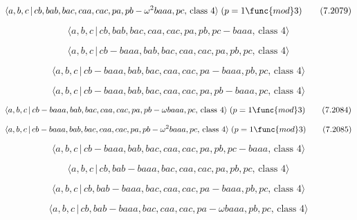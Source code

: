 \documentclass[10pt]{article}
\begin{document}
\begin{equation}
\langle a,b,c\,|\,cb,bab,bac,caa,cac,pa,pb-\omega ^{2}baaa,pc,\,\text{class }%
4\rangle \;(p=1\func{mod}3)  \tag{7.2079}
\end{equation}

\begin{equation}
\langle a,b,c\,|\,cb,bab,bac,caa,cac,pa,pb,pc-baaa,\,\text{class }4\rangle 
\tag{7.2080}
\end{equation}

\begin{equation}
\langle a,b,c\,|\,cb-baaa,bab,bac,caa,cac,pa,pb,pc,\,\text{class }4\rangle 
\tag{7.2081}
\end{equation}

\begin{equation}
\langle a,b,c\,|\,cb-baaa,bab,bac,caa,cac,pa-baaa,pb,pc,\,\text{class }%
4\rangle  \tag{7.2082}
\end{equation}

\begin{equation}
\langle a,b,c\,|\,cb-baaa,bab,bac,caa,cac,pa,pb-baaa,pc,\,\text{class }%
4\rangle  \tag{7.2083}
\end{equation}

\begin{equation}
\langle a,b,c\,|\,cb-baaa,bab,bac,caa,cac,pa,pb-\omega baaa,pc,\,\text{class 
}4\rangle \;(p=1\func{mod}3)  \tag{7.2084}
\end{equation}

\begin{equation}
\langle a,b,c\,|\,cb-baaa,bab,bac,caa,cac,pa,pb-\omega ^{2}baaa,pc,\,\text{%
class }4\rangle \;(p=1\func{mod}3)  \tag{7.2085}
\end{equation}

\begin{equation}
\langle a,b,c\,|\,cb-baaa,bab,bac,caa,cac,pa,pb,pc-baaa,\,\text{class }%
4\rangle  \tag{7.2086}
\end{equation}

\begin{equation}
\langle a,b,c\,|\,cb,bab-baaa,bac,caa,cac,pa,pb,pc,\,\text{class }4\rangle 
\tag{7.2087}
\end{equation}

\begin{equation}
\langle a,b,c\,|\,cb,bab-baaa,bac,caa,cac,pa-baaa,pb,pc,\,\text{class }%
4\rangle  \tag{7.2088}
\end{equation}

\begin{equation}
\langle a,b,c\,|\,cb,bab-baaa,bac,caa,cac,pa-\omega baaa,pb,pc,\,\text{class 
}4\rangle  \tag{7.2089}
\end{equation}
\end{document}
